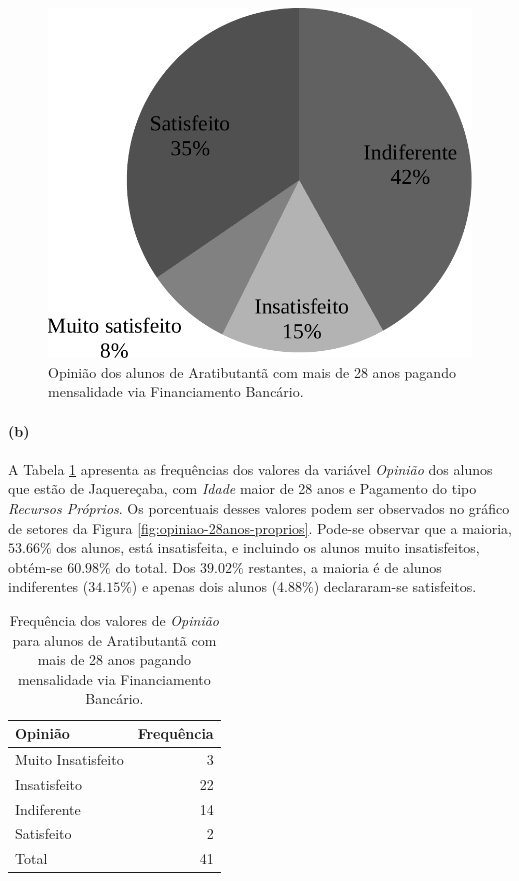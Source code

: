 \documentclass[10pt,a4paper,oneside]{article}
\newcommand{\arat}{Aratibutantã\xspace}
\newcommand{\jaqu}{Jaquereçaba\xspace}
\begin{document}
\begin{figure}[!h]
	\centering
	\includegraphics[width=.5\linewidth]{plots/q17a.pdf}
	\caption{Opinião dos alunos de \arat com mais de 28 anos pagando mensalidade via Financiamento Bancário.}
	\label{fig:opiniao-28anos-finBancario}
\end{figure}

\paragraph{(b)}

A Tabela \ref{table:opiniao-28anos-proprios} apresenta as frequências dos valores da variável \textit{Opinião} dos alunos que estão de \jaqu, com \textit{Idade} maior de 28 anos e Pagamento do tipo \textit{Recursos Próprios}. Os porcentuais desses valores podem ser observados no gráfico de setores da Figura \ref{fig:opiniao-28anos-proprios}.
Pode-se observar que a maioria, $53.66\%$ dos alunos, está insatisfeita, e incluindo os alunos muito insatisfeitos, obtém-se $60.98\%$ do total. Dos $39.02\%$ restantes, a maioria é de alunos indiferentes ($34.15\%$) e apenas dois alunos (4.88\%) declararam-se satisfeitos.

\begin{table}[!h]
	\small
	\centering
	\caption{Frequência dos valores de \textit{Opinião} para alunos de \arat com mais de 28 anos pagando mensalidade via Financiamento Bancário.}
	\label{table:opiniao-28anos-proprios}
	\begin{tabular}{l r}
		\toprule
		\textbf{Opinião}    & \textbf{Frequência} \\
		\midrule
		Muito Insatisfeito  &  3  \\
		Insatisfeito        &  22 \\
		Indiferente         &  14 \\
		Satisfeito          &  2  \\
		\midrule
		Total               &  41 \\
		\bottomrule
	\end{tabular}
\end{table}
\end{document}
